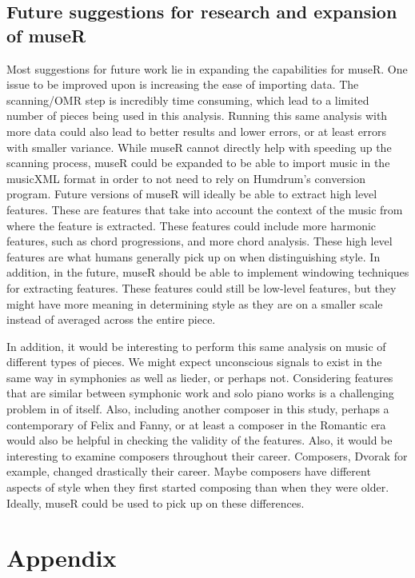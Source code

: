 \documentclass[12pt,twoside]{reedthesis}
\theoremstyle{definition}
\theoremstyle{definition}
\theoremstyle{definition}
\theoremstyle{remark}
\begin{document}
\section{Future suggestions for research and expansion of
museR}\label{future-suggestions-for-research-and-expansion-of-muser}

Most suggestions for future work lie in expanding the capabilities for
museR. One issue to be improved upon is increasing the ease of importing
data. The scanning/OMR step is incredibly time consuming, which lead to
a limited number of pieces being used in this analysis. Running this
same analysis with more data could also lead to better results and lower
errors, or at least errors with smaller variance. While museR cannot
directly help with speeding up the scanning process, museR could be
expanded to be able to import music in the musicXML format in order to
not need to rely on Humdrum's conversion program. Future versions of
museR will ideally be able to extract high level features. These are
features that take into account the context of the music from where the
feature is extracted. These features could include more harmonic
features, such as chord progressions, and more chord analysis. These
high level features are what humans generally pick up on when
distinguishing style. In addition, in the future, museR should be able
to implement windowing techniques for extracting features. These
features could still be low-level features, but they might have more
meaning in determining style as they are on a smaller scale instead of
averaged across the entire piece.

In addition, it would be interesting to perform this same analysis on
music of different types of pieces. We might expect unconscious signals
to exist in the same way in symphonies as well as lieder, or perhaps
not. Considering features that are similar between symphonic work and
solo piano works is a challenging problem in of itself. Also, including
another composer in this study, perhaps a contemporary of Felix and
Fanny, or at least a composer in the Romantic era would also be helpful
in checking the validity of the features. Also, it would be interesting
to examine composers throughout their career. Composers, Dvorak for
example, changed drastically their career. Maybe composers have
different aspects of style when they first started composing than when
they were older. Ideally, museR could be used to pick up on these
differences.

\chapter*{Appendix}\label{appendix}
\end{document}
